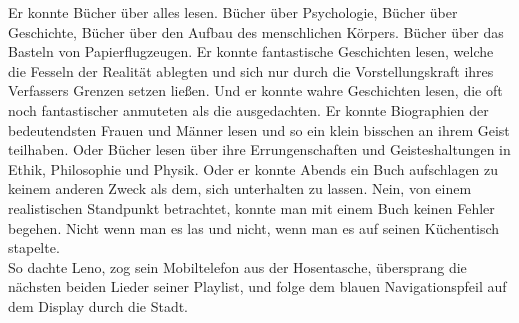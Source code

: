 \documentclass[ngerman,smalldemyvopaper,11pt,oneside,onecolumn,openright,extrafontsizes]{memoir}
\begin{document}
Er konnte Bücher über alles lesen. Bücher über Psychologie, Bücher über Geschichte, Bücher über den Aufbau des menschlichen Körpers. Bücher über das Basteln von Papierflugzeugen. Er konnte fantastische Geschichten lesen, welche die Fesseln der Realität ablegten und sich nur durch die Vorstellungskraft ihres Verfassers Grenzen setzen ließen. Und er konnte wahre Geschichten lesen, die oft noch fantastischer anmuteten als die ausgedachten. Er konnte Biographien der bedeutendsten Frauen und Männer lesen und so ein klein bisschen an ihrem Geist teilhaben. Oder Bücher lesen über ihre Errungenschaften und Geisteshaltungen in Ethik, Philosophie und Physik. Oder er konnte Abends ein Buch aufschlagen zu keinem anderen Zweck als dem, sich unterhalten zu lassen. Nein, von einem realistischen Standpunkt betrachtet, konnte man mit einem Buch keinen Fehler begehen. Nicht wenn man es las und nicht, wenn man es auf seinen Küchentisch stapelte.
\vspace{0.5em} \\
So dachte Leno, zog sein Mobiltelefon aus der Hosentasche, übersprang die nächsten beiden Lieder seiner Playlist, und folge dem blauen Navigationspfeil auf dem Display durch die Stadt.
\end{document}
